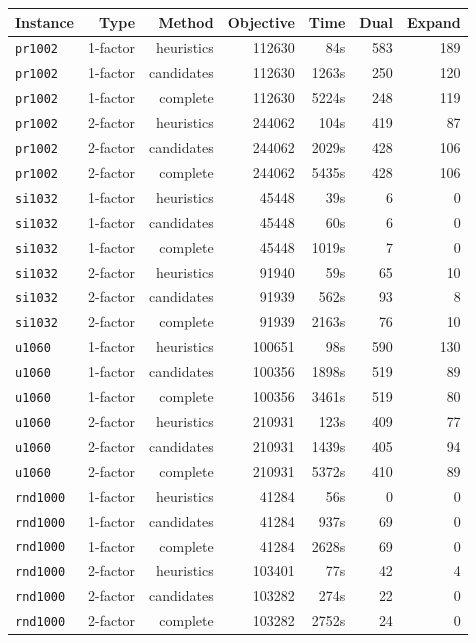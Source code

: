 \documentclass[a4paper,11pt,twoside]{book}
\begin{document}
\begin{multicols}{2}
\bigskip
\begin{center}
\small
\begin{tabular}{|lrrrrrr|}
\hline
{\bf Instance} & {\bf Type} & {\bf Method} & {\bf Objective} & {\bf Time}
& {\bf Dual} & {\bf Expand} \\
\hline
\hline
\verb/pr1002/  &   1-factor & heuristics  & 112630 &   84s & 583 & 189 \\
\verb/pr1002/  &   1-factor & candidates  & 112630 & 1263s & 250 & 120 \\
\verb/pr1002/  &   1-factor & complete    & 112630 & 5224s & 248 & 119 \\
\verb/pr1002/  &   2-factor & heuristics  & 244062 &  104s & 419 &  87 \\
\verb/pr1002/  &   2-factor & candidates  & 244062 & 2029s & 428 & 106 \\
\verb/pr1002/  &   2-factor & complete    & 244062 & 5435s & 428 & 106 \\
\verb/si1032/  &   1-factor & heuristics  &  45448 &   39s &   6 &   0 \\
\verb/si1032/  &   1-factor & candidates  &  45448 &   60s &   6 &   0 \\
\verb/si1032/  &   1-factor & complete    &  45448 & 1019s &   7 &   0 \\
\verb/si1032/  &   2-factor & heuristics  &  91940 &   59s &  65 &  10 \\
\verb/si1032/  &   2-factor & candidates  &  91939 &  562s &  93 &   8 \\
\verb/si1032/  &   2-factor & complete    &  91939 & 2163s &  76 &  10 \\
\verb/u1060/   &   1-factor & heuristics  & 100651 &   98s & 590 & 130 \\
\verb/u1060/   &   1-factor & candidates  & 100356 & 1898s & 519 &  89 \\
\verb/u1060/   &   1-factor & complete    & 100356 & 3461s & 519 &  80 \\
\verb/u1060/   &   2-factor & heuristics  & 210931 &  123s & 409 &  77 \\
\verb/u1060/   &   2-factor & candidates  & 210931 & 1439s & 405 &  94 \\
\verb/u1060/   &   2-factor & complete    & 210931 & 5372s & 410 &  89 \\
\verb/rnd1000/ &   1-factor & heuristics  &  41284 &   56s &   0 &   0 \\
\verb/rnd1000/ &   1-factor & candidates  &  41284 &  937s &  69 &   0 \\
\verb/rnd1000/ &   1-factor & complete    &  41284 & 2628s &  69 &   0 \\
\verb/rnd1000/ &   2-factor & heuristics  & 103401 &   77s &  42 &   4 \\
\verb/rnd1000/ &   2-factor & candidates  & 103282 &  274s &  22 &   0 \\
\verb/rnd1000/ &   2-factor & complete    & 103282 & 2752s &  24 &   0 \\
\hline
\end{tabular}
\end{center}




\end{multicols}
\end{document}
